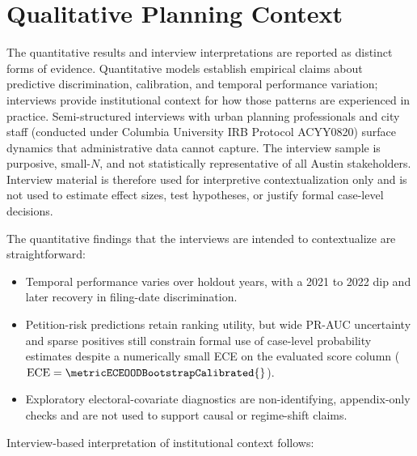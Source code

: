 \documentclass[11pt, letterpaper]{article}
\begin{document}
\section{Qualitative Planning Context}
\label{sec:interviews}

The quantitative results and interview interpretations are reported as distinct forms of evidence. Quantitative models establish empirical claims about predictive discrimination, calibration, and temporal performance variation; interviews provide institutional context for how those patterns are experienced in practice. Semi-structured interviews with urban planning professionals and city staff (conducted under Columbia University IRB Protocol ACYY0820) surface dynamics that administrative data cannot capture. The interview sample is purposive, small-$N$, and not statistically representative of all Austin stakeholders. Interview material is therefore used for interpretive contextualization only and is not used to estimate effect sizes, test hypotheses, or justify formal case-level decisions.

The quantitative findings that the interviews are intended to contextualize are straightforward:
\begin{itemize}
    \item Temporal performance varies over holdout years, with a 2021 to 2022 dip and later recovery in filing-date discrimination.
    \item Petition-risk predictions retain ranking utility, but wide PR-AUC uncertainty and sparse positives still constrain formal use of case-level probability estimates despite a numerically small ECE on the evaluated score column ($\text{ECE}=\metricECEOODBootstrapCalibrated{}$).
    \item Exploratory electoral-covariate diagnostics are non-identifying, appendix-only checks and are not used to support causal or regime-shift claims.
\end{itemize}

Interview-based interpretation of institutional context follows:
\end{document}
